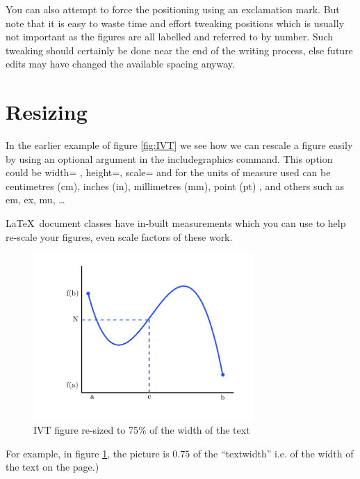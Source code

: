 \documentclass[a4paper,11pt]{article}
\begin{document}
You can also attempt to force the positioning using an exclamation mark. But note that it is easy to waste time and effort tweaking positions which is usually not important as the figures are all labelled and referred to by number. Such tweaking should certainly be done near the end of the writing process, else future edits may have changed the available spacing anyway.

\pagebreak

\section{Resizing}

In the earlier example of figure \ref{fig:IVT} we see how we can rescale a figure easily by using an optional argument in the includegraphics command. This option could be width= , height=, scale= and for the units of measure used can be centimetres (cm), inches (in), millimetres (mm),
point (pt)  %
, and others such as
em, %
ex, %
mu,
 \dots

\LaTeX\ document classes have in-built measurements which you can use to help re-scale your figures, even scale factors of these work.
%
\begin{figure}[hbtp]
	\centering %
	\includegraphics[width=0.75\textwidth]{IVT.jpg} %
	\caption{IVT figure re-sized to 75\% of the width of the text}
	\label{fig:IVT75}  %
\end{figure}
%
For example, in figure \ref{fig:IVT75}, the picture is $0.75$ of the ``textwidth'' i.e. of the width of the text on the page.)
\end{document}
